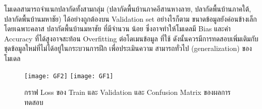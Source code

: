 

\par


\indent โมเดลสามารถจำแนกปลากัดทั้งสามกลุ่ม (ปลากัดพื้นบ้านภาคอีสานหางลาย, ปลากัดพื้นบ้านภาคใต้, ปลากัดพื้นบ้านมหาชัย) ได้อย่างถูกต้องบน
Validation set อย่างไรก็ตาม ขนาดข้อมูลยังค่อนข้างเล็กโดยเฉพาะคลาส ปลากัดพื้นบ้านมหาชัย ที่มีจำนวน
น้อย ซึ่งอาจทำให้โมเดลมี Bias และค่า Accuracy ที่ได้สูงอาจสะท้อน Overfitting ต่อโดเมนข้อมูล
ที่ใช้ ดังนั้นควรมีการทดสอบเพิ่มเติมกับชุดข้อมูลใหม่ที่ไม่ได้อยู่ในกระบวนการฝึก เพื่อประเมินความ
สามารถทั่วไป (generalization) ของโมเดล

\vspace{\baselineskip}

\begin{figure}[h]
	\centering
	\texttt{[image: GF2]}
	\hfill
	\texttt{[image: GF1]}
	\caption{กราฟ Loss ของ Train และ Validation และ Confusion Matrix ของผลการทดสอบ}
\end{figure}

\par\endgroup
\clearpage

